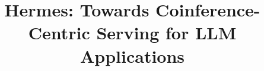 \documentclass[letterpaper,twocolumn,10pt]{article}
\begin{document}
\title{Hermes: Towards Coinference-Centric Serving for LLM Applications} %




\maketitle
\end{document}

